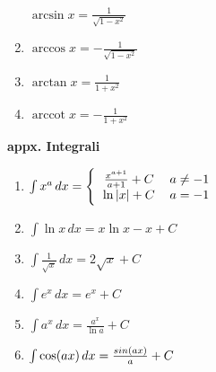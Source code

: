 \documentclass{article}
\begin{document}
\begin{multicols}{3}
\begin{center}
\begin{enumerate}
\begin{math}
            \arcsin x = \frac{1}{\sqrt {1 - x^2}}
        \end{math}
        \item \begin{math}
            \arccos x = - \frac{1}{\sqrt{1 - x^2}}
        \end{math}
        \item \begin{math}
            \arctan x = \frac{1}{1 + x^2}
        \end{math}
        \item \begin{math}
            \operatorname{arccot}x = -\frac{1}{1 + x^2}
        \end{math}
    \end{enumerate}
\end{center}
\textbf{appx. Integrali}
\begin{center}
    \begin{enumerate}
        \item \begin{math}
            \int x^a\,dx =
            \Bigg\{\begin{tabular}{ccc}
                $\frac{x^{a+1}}{a+1} + C$  & $a \neq -1$ & \\
                $ \ln{\left|x\right|} + C$ & $a = -1$ & \\
              \end{tabular}
        \end{math}
        \item \begin{math}
            \int \ln {x}\,dx = x \ln {x} - x + C
        \end{math}
        \item \begin{math}
            \int \frac {1}{\sqrt{x}}\,dx=2\sqrt{x} + C 
        \end{math}
        \item \begin{math}
            \int e^x\,dx = e^x + C
        \end{math}
        \item \begin{math}
            \int a^x\,dx = \frac{a^x}{\ln{a}} + C
        \end{math}
        \item \begin{math}
            \int \cos({ax}) \, dx = {sin (ax) \over a} + C
        \end{math}

\end{enumerate}
\end{center}
\end{multicols}
\end{document}
